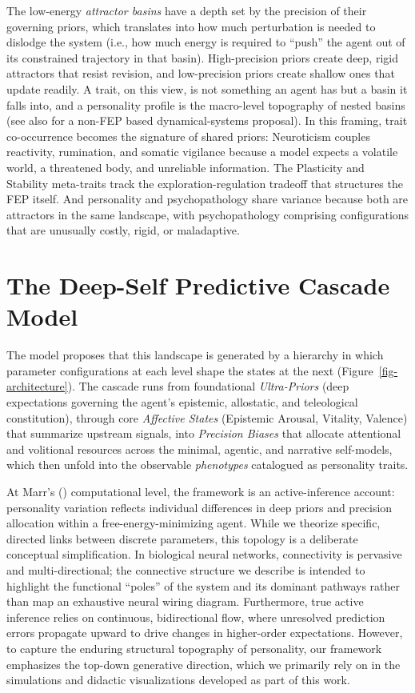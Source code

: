 \documentclass[
  jou,
  floatsintext,
  longtable,
  nolmodern,
  notxfonts,
  notimes,
  12pt,
  colorlinks=true,linkcolor=blue,citecolor=blue,urlcolor=blue]{apa7}
\begin{document}
The low-energy \emph{attractor basins} have a depth set by the precision
of their governing priors, which translates into how much perturbation
is needed to dislodge the system (i.e., how much energy is required to
``push'' the agent out of its constrained trajectory in that basin).
High-precision priors create deep, rigid attractors that resist
revision, and low-precision priors create shallow ones that update
readily. A trait, on this view, is not something an agent has but a
basin it falls into, and a personality profile is the macro-level
topography of nested basins (see also
 for a
non-FEP based dynamical-systems proposal). In this framing, trait
co-occurrence becomes the signature of shared priors: Neuroticism
couples reactivity, rumination, and somatic vigilance because a model
expects a volatile world, a threatened body, and unreliable information.
The Plasticity and Stability meta-traits track the
exploration-regulation tradeoff that structures the FEP itself. And
personality and psychopathology share variance because both are
attractors in the same landscape, with psychopathology comprising
configurations that are unusually costly, rigid, or maladaptive.

\section{The Deep-Self Predictive Cascade
Model}\label{the-deep-self-predictive-cascade-model}

The model proposes that this landscape is generated by a hierarchy in
which parameter configurations at each level shape the states at the
next (Figure~\ref{fig-architecture}). The cascade runs from foundational
\emph{Ultra-Priors} (deep expectations governing the agent's epistemic,
allostatic, and teleological constitution), through core \emph{Affective
States} (Epistemic Arousal, Vitality, Valence) that summarize upstream
signals, into \emph{Precision Biases} that allocate attentional and
volitional resources across the minimal, agentic, and narrative
self-models, which then unfold into the observable \emph{phenotypes}
catalogued as personality traits.

At Marr's () computational level, the
framework is an active-inference account: personality variation reflects
individual differences in deep priors and precision allocation within a
free-energy-minimizing agent. While we theorize specific, directed links
between discrete parameters, this topology is a deliberate conceptual
simplification. In biological neural networks, connectivity is pervasive
and multi-directional; the connective structure we describe is intended
to highlight the functional ``poles'' of the system and its dominant
pathways rather than map an exhaustive neural wiring diagram.
Furthermore, true active inference relies on continuous, bidirectional
flow, where unresolved prediction errors propagate upward to drive
changes in higher-order expectations. However, to capture the enduring
structural topography of personality, our framework emphasizes the
top-down generative direction, which we primarily rely on in the
simulations and didactic visualizations developed as part of this work.
\end{document}
